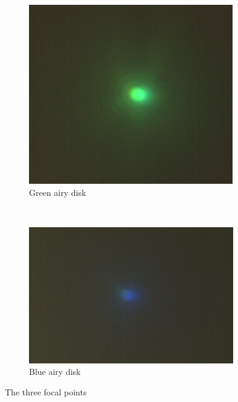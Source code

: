 \documentclass[a4paper,12pt]{article}
\begin{document}
\begin{figure}[H]
\begin{subfigure}{0.3\textwidth}
                \includegraphics[width=\textwidth]{greenfocus}
                \caption{Green airy disk}
                \label{fig:greenfocus}
        \end{subfigure}%
        ~ %
        \begin{subfigure}{0.3\textwidth}
                \includegraphics[width=\textwidth]{bluefocus}
                \caption{Blue airy disk}
                \label{fig:bluefocus}
        \end{subfigure}
        \caption{The three focal points}\label{fig:Chromatic abberations}
\end{figure}
\end{document}
